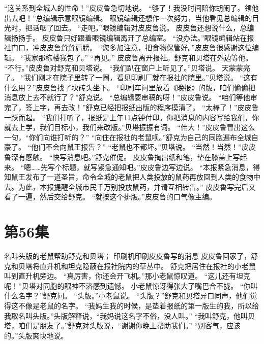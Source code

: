 \documentclass[a4paper,12pt,UTF8,twoside]{ctexbook}
\begin{document}
        “这关系到全城人的性命！”皮皮鲁急切地说。 
        “够了！我没时间陪你胡闹了。领他出去吧！”总编辑示意眼镜编辑。 
        眼镜编辑还想作一次努力，当他看见总编辑的目光时，把话咽了回去。 
        “走吧。”眼镜编辑对皮皮鲁说。 
        皮皮鲁还想说什么，总编辑扬扬手。 
        皮皮鲁只好跟着眼镜编辑离开了总编室。 
        “没办法。”眼镜编辑站在报社门口，冲皮皮鲁耸耸肩膀。 
        “您多加注意，把食物保管好。”皮皮鲁很感谢这位编辑。 
        “我家那栋楼我包了。” 
        “再见。” 
        皮皮鲁离开报社。舒克和贝塔在外边等他。 
        “不行。”皮皮鲁对舒克和贝塔说。 
        “我们趴在窗户上听见了。”贝塔说。 
        天蒙蒙亮了。 
        “我们刚才在院子里转了一圈，看见印刷厂就在报社的院里。”贝塔说。 
        “这有什么用？”皮皮鲁找了块砖头坐下。 
        “印刷车问里放着《晚报》的版，咱们偷偷把消息放上去不就行了？”舒克说。 
        “总编辑要审稿的呀！”皮皮鲁说。 
        “咱们等他审完了，签上字，再去改！”舒克已经把报纸出版的程序摸清了。 
        “太棒了！”皮皮鲁一跃而起。 
        “我们打听了，报纸是上午11点钟付印。你把消息的内容写给我们，你就去上学，我们目标小，我们来改版。”贝塔振振有词。 
        “伟大！”皮皮鲁冒出这么一句，“你们向谁打听的？” 
        “向住在报社的老鼠呗。”舒克为自己的同胞遍布全城自豪了。 
        “他们不会向鼠王报告？” 
        “老鼠也不都坏。”贝塔说。 
        “当然！当然！”皮皮鲁深有感触。 
        “快写消息吧。”舒克催促。 
        皮皮鲁掏出纸和笔，垫在膝盖上写起来。 
        “嗯……先写个标题，就写紧急通知吧。”皮皮鲁边写边说。 
        “本报紧急消息，得知鼠王发布了一道圣旨，命令全城的老鼠把人类投放的鼠药再放回到人类的食物中去。为此，本报提醒全城市民千万别投放鼠药，并请互相转告。” 
        皮皮鲁写完后又看了一遍，然后交给舒克。 
        “就按这个排版。”皮皮鲁的口气像主编。   \chapter{第56集} 
        名叫头版的老鼠帮助舒克和贝塔； 
        印刷机印刷皮皮鲁写的消息   
        皮皮鲁回家了，舒克和贝塔将直升机和坦克隐蔽在报社院内的草丛中。 
        舒克把居住在报社的小老鼠叫到直升机旁边。 
        “真厉害，你还会开飞机。”那小老鼠惊叹道。 
        “这儿还有坦克呢！”贝塔对同胞的眼神不济感到遗憾。 
        小老鼠惊讶得张大了嘴巴合不拢。 
        “你叫什么名字？”舒克问。 
        “头版。”小老鼠说。 
        “头版？”舒克和贝塔异口同声，他们觉得这不像是老鼠的名字。 
        “我妈生我的时候，是垫着报纸的第一版生的我，所以给我取名叫头版。”头版解释说，“我妈说这名字不俗，没人叫。” 
        “我叫舒克，他叫贝塔，咱们是朋友了。”舒克对头版说，“谢谢你晚上帮助我们。” 
        “别客气，应该的。”头版爽快地说。 
\end{document}
